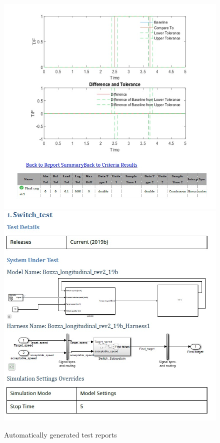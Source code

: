 \documentclass[12pt,a4paper]{report}
\begin{document}
\begin{figure}[!h]
	\centering
	\includegraphics[scale=0.4]{switch_baseline.jpg}
	\includegraphics[scale=0.4]{switch_tes_spec.jpg}
	\caption{Automatically generated test reports}
	\label{switch_baseline}
\end{figure}
\FloatBarrier
\end{document}
